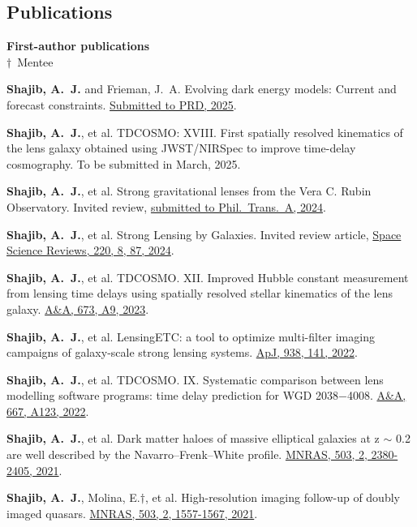 \documentclass[margin, line]{res}
\begin{document}
\begin{resume}
\section{\sc Publications}
\textbf{First-author publications}
\newcommand{\mentee}{${\boldsymbol{\dagger}}$}
\\ \mentee\ Mentee
\begin{etaremune}
	\item \textbf{Shajib, A.~J.} and Frieman, J.~A. Evolving dark energy models: Current and forecast constraints. \href{https://}{Submitted to PRD, 2025}.
	\item \textbf{Shajib, A.~J.}, et al. TDCOSMO: XVIII. First spatially resolved kinematics of the lens galaxy obtained using JWST/NIRSpec to improve time-delay cosmography. To be submitted in March, 2025. 
	\item \textbf{Shajib, A.~J.}, et al. Strong gravitational lenses from the Vera C. Rubin Observatory. Invited review, \href{https://ui.adsabs.harvard.edu/abs/2024arXiv240608919S/abstract}{submitted to Phil.~Trans.~A, 2024}.
	\item \textbf{Shajib, A.~J.}, et al. Strong Lensing by Galaxies. Invited review article, \href{https://ui.adsabs.harvard.edu/abs/2022arXiv221010790S/abstract}{Space Science Reviews, 220, 8, 87, 2024}.
	\item \textbf{Shajib, A.~J.}, et al. TDCOSMO. XII. Improved Hubble constant measurement from lensing time delays using spatially resolved stellar kinematics of the lens galaxy. \href{https://ui.adsabs.harvard.edu/abs/2023arXiv230102656S/abstract}{A\&A, 673, A9, 2023}.
	\item \textbf{Shajib, A.~J.}, et al. LensingETC: a tool to optimize multi-filter imaging campaigns of galaxy-scale strong lensing systems. \href{https://doi.org/10.3847/1538-4357/ac927b}{ApJ, 938, 141, 2022}.
	\item \textbf{Shajib, A.~J.}, et al. TDCOSMO. IX. Systematic comparison between lens modelling software programs: time delay prediction for WGD 2038$-$4008. \href{https://arxiv.org/abs/2202.11101}{A\&A, 667, A123, 2022}.
	\item \textbf{Shajib, A.~J.}, et al. Dark matter haloes of massive elliptical galaxies at z $\sim$ 0.2 are well described by the Navarro--Frenk--White profile. \href{https://doi.org/10.1093/mnras/stab536}{MNRAS, 503, 2, 2380-2405, 2021}.
	\item \textbf{Shajib, A.~J.}, Molina, E.{\mentee}, et al. High-resolution imaging follow-up of doubly imaged quasars. \href{https://doi:10.1093/mnras/stab532}{MNRAS, 503, 2, 1557-1567, 2021}.

\end{etaremune}
\end{resume}
\end{document}
